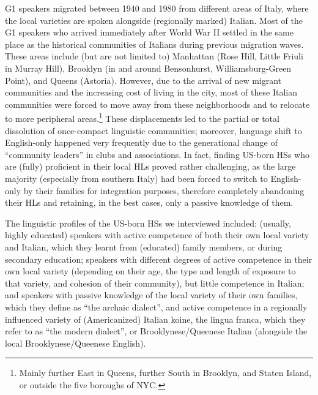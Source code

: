 \documentclass[output=paper,hidelinks]{langscibook}
\begin{document}
G1 speakers migrated between 1940 and 1980 from different areas of Italy, where the local varieties are spoken alongside (regionally marked) Italian. Most of the G1 speakers who arrived immediately after World War II settled in the same place as the historical communities of Italians during previous migration waves. These areas include (but are not limited to) Manhattan (Rose Hill, Little Friuli in Murray Hill), Brooklyn (in and around Bensonhurst, Williamsburg-Green Point), and Queens (Astoria). However, due to the arrival of new migrant communities and the increasing cost of living in the city, most of these Italian communities were forced to move away from these neighborhoods and to relocate to more peripheral areas.\footnote{Mainly further East in Queens, further South in Brooklyn, and Staten Island, or outside the five boroughs of NYC.} These displacements led to the partial or total dissolution of once-compact linguistic communities; moreover, language shift to English-only happened very frequently due to the generational change of ``community leaders'' in clubs and associations. In fact, finding US-born HSs who are (fully) proficient in their local HLs proved rather challenging, as the large majority (especially from southern Italy) had been forced to switch to English-only by their families for integration purposes, therefore completely abandoning their HLs and retaining, in the best cases, only a passive knowledge of them. 

The linguistic profiles of the US-born HSs we interviewed included: (usually, highly educated) speakers with active competence of both their own local variety and Italian, which they learnt from (educated) family members, or during secondary education; speakers with different degrees of active competence in their own local variety (depending on their age, the type and length of exposure to that variety, and cohesion of their community), but little competence in Italian; and speakers with passive knowledge of the local variety of their own families, which they define as “the archaic dialect”, and active competence in a regionally influenced variety of (Americanized) Italian koine, the lingua franca, which they refer to as ``the modern dialect'', or Brooklynese/Queenese Italian (alongside the local Brooklynese/Queenese English).
\end{document}

